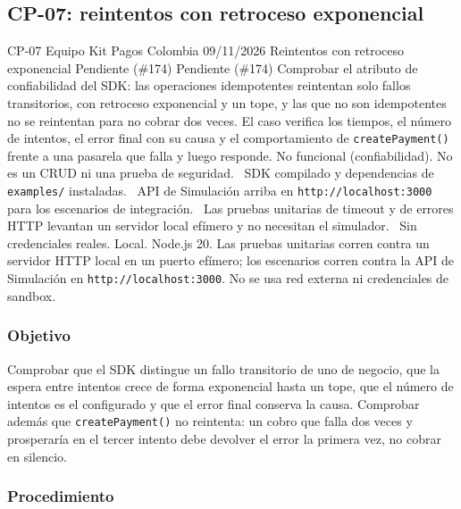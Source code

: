 \subsection{CP-07: reintentos con retroceso exponencial}
\label{anexo:cp07}

\FichaCaso
  {CP-07}
  {Equipo Kit Pagos Colombia}
  {09/11/2026}
  {Reintentos con retroceso exponencial}
  {Pendiente (\#174)}
  {Pendiente (\#174)}
  {Comprobar el atributo de confiabilidad del SDK: las operaciones idempotentes reintentan solo fallos transitorios, con retroceso exponencial y un tope, y las que no son idempotentes no se reintentan para no cobrar dos veces. El caso verifica los tiempos, el número de intentos, el error final con su causa y el comportamiento de \texttt{createPayment()} frente a una pasarela que falla y luego responde.}
  {No funcional (confiabilidad). No es un CRUD ni una prueba de seguridad.}
  {\textbullet\ SDK compilado y dependencias de \texttt{examples/} instaladas.\newline
   \textbullet\ API de Simulación arriba en \texttt{http://localhost:3000} para los escenarios de integración.\newline
   \textbullet\ Las pruebas unitarias de timeout y de errores HTTP levantan un servidor local efímero y no necesitan el simulador.\newline
   \textbullet\ Sin credenciales reales.}
  {Local. Node.js 20. Las pruebas unitarias corren contra un servidor HTTP local en un puerto efímero; los escenarios corren contra la API de Simulación en \texttt{http://localhost:3000}. No se usa red externa ni credenciales de sandbox.}

\subsubsection{Objetivo}

Comprobar que el SDK distingue un fallo transitorio de uno de negocio, que la espera entre intentos crece de forma exponencial hasta un tope, que el número de intentos es el configurado y que el error final conserva la causa. Comprobar además que \texttt{createPayment()} no reintenta: un cobro que falla dos veces y prosperaría en el tercer intento debe devolver el error la primera vez, no cobrar en silencio.

\subsubsection{Procedimiento}

